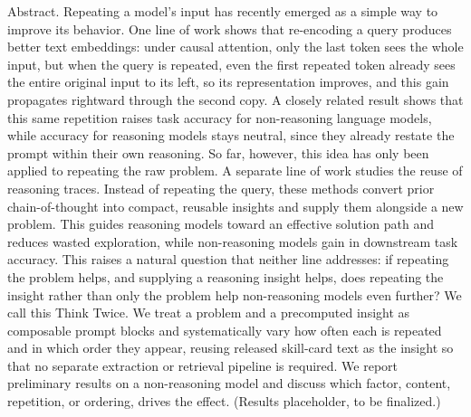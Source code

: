 Abstract. Repeating a model's input has recently emerged as a simple way to improve its behavior. One line of work shows that re-encoding a query produces better text embeddings: under causal attention, only the last token sees the whole input, but when the query is repeated, even the first repeated token already sees the entire original input to its left, so its representation improves, and this gain propagates rightward through the second copy. A closely related result shows that this same repetition raises task accuracy for non-reasoning language models, while accuracy for reasoning models stays neutral, since they already restate the prompt within their own reasoning. So far, however, this idea has only been applied to repeating the raw problem.
A separate line of work studies the reuse of reasoning traces. Instead of repeating the query, these methods convert prior chain-of-thought into compact, reusable insights and supply them alongside a new problem. This guides reasoning models toward an effective solution path and reduces wasted exploration, while non-reasoning models gain in downstream task accuracy. This raises a natural question that neither line addresses: if repeating the problem helps, and supplying a reasoning insight helps, does repeating the insight rather than only the problem help non-reasoning models even further?
We call this Think Twice. We treat a problem and a precomputed insight as composable prompt blocks and systematically vary how often each is repeated and in which order they appear, reusing released skill-card text as the insight so that no separate extraction or retrieval pipeline is required. We report preliminary results on a non-reasoning model and discuss which factor, content, repetition, or ordering, drives the effect. (Results placeholder, to be finalized.)